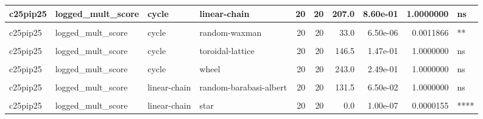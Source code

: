 \documentclass[
]{book}
\begin{document}
\begin{table}
\begin{tabular}{l|l|l|l|r|r|r|r|r|l}
\hline
c25pip25 & logged\_mult\_score & cycle & linear-chain & 20 & 20 & 207.0 & 8.60e-01 & 1.0000000 & ns\\
\hline
\cellcolor{gray!6}{c25pip25} & \cellcolor{gray!6}{logged\_mult\_score} & \cellcolor{gray!6}{cycle} & \cellcolor{gray!6}{random-barabasi-albert} & \cellcolor{gray!6}{20} & \cellcolor{gray!6}{20} & \cellcolor{gray!6}{104.5} & \cellcolor{gray!6}{1.00e-02} & \cellcolor{gray!6}{1.0000000} & \cellcolor{gray!6}{ns}\\
\hline
c25pip25 & logged\_mult\_score & cycle & random-waxman & 20 & 20 & 33.0 & 6.50e-06 & 0.0011866 & **\\
\hline
\cellcolor{gray!6}{c25pip25} & \cellcolor{gray!6}{logged\_mult\_score} & \cellcolor{gray!6}{cycle} & \cellcolor{gray!6}{star} & \cellcolor{gray!6}{20} & \cellcolor{gray!6}{20} & \cellcolor{gray!6}{0.0} & \cellcolor{gray!6}{1.00e-07} & \cellcolor{gray!6}{0.0000155} & \cellcolor{gray!6}{****}\\
\hline
c25pip25 & logged\_mult\_score & cycle & toroidal-lattice & 20 & 20 & 146.5 & 1.47e-01 & 1.0000000 & ns\\
\hline
\cellcolor{gray!6}{c25pip25} & \cellcolor{gray!6}{logged\_mult\_score} & \cellcolor{gray!6}{cycle} & \cellcolor{gray!6}{well-mixed} & \cellcolor{gray!6}{20} & \cellcolor{gray!6}{20} & \cellcolor{gray!6}{105.5} & \cellcolor{gray!6}{1.10e-02} & \cellcolor{gray!6}{1.0000000} & \cellcolor{gray!6}{ns}\\
\hline
c25pip25 & logged\_mult\_score & cycle & wheel & 20 & 20 & 243.0 & 2.49e-01 & 1.0000000 & ns\\
\hline
\cellcolor{gray!6}{c25pip25} & \cellcolor{gray!6}{logged\_mult\_score} & \cellcolor{gray!6}{cycle} & \cellcolor{gray!6}{windmill} & \cellcolor{gray!6}{20} & \cellcolor{gray!6}{20} & \cellcolor{gray!6}{306.0} & \cellcolor{gray!6}{4.00e-03} & \cellcolor{gray!6}{0.5080000} & \cellcolor{gray!6}{ns}\\
\hline
c25pip25 & logged\_mult\_score & linear-chain & random-barabasi-albert & 20 & 20 & 131.5 & 6.50e-02 & 1.0000000 & ns\\
\hline
\cellcolor{gray!6}{c25pip25} & \cellcolor{gray!6}{logged\_mult\_score} & \cellcolor{gray!6}{linear-chain} & \cellcolor{gray!6}{random-waxman} & \cellcolor{gray!6}{20} & \cellcolor{gray!6}{20} & \cellcolor{gray!6}{36.0} & \cellcolor{gray!6}{9.60e-06} & \cellcolor{gray!6}{0.0016826} & \cellcolor{gray!6}{**}\\
\hline
c25pip25 & logged\_mult\_score & linear-chain & star & 20 & 20 & 0.0 & 1.00e-07 & 0.0000155 & ****\\

\end{tabular}
\end{table}
\end{document}
